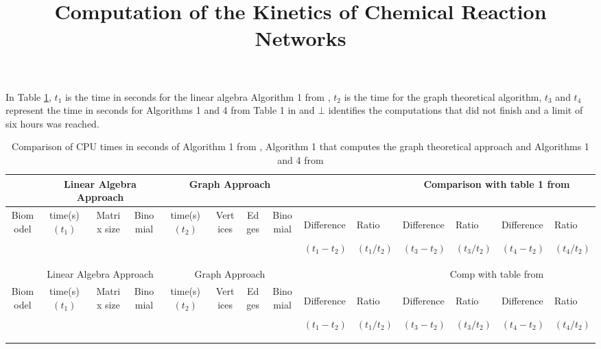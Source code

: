 \documentclass[11pt]{article}
\begin{document}
\begin{landscape}
\title{Computation of the Kinetics of Chemical Reaction Networks}
\date{}
\author{}
\maketitle

In Table \ref{t:res}, $t_{1}$ is the time in seconds for the linear algebra Algorithm 1 from \cite{rahkooy2020linear}, $t_{2}$ is the time for the graph theoretical algorithm, $t_{3}$ and $t_{4}$ represent the time in seconds for Algorithms 1 and 4 from Table 1 in \cite{grigoriev2019efficiently} and $\bot$ identifies the computations that did not finish and a limit of six hours was reached.
\setlength{\tabcolsep}{2pt}
\begin{small}
\begin{longtable}[c]{| c | c | c | c |c |c |c |c |p{1.5cm} |p{1.5cm} |p{1.5cm} |p{1.5cm} |p{1.5cm} |p{1.5cm} |}

 \caption{Comparison of CPU times in seconds of Algorithm 1 from \cite{rahkooy2020linear}, Algorithm 1 that computes the graph theoretical approach and Algorithms 1 and 4 from \cite{grigoriev2019efficiently}\label{t:res}}\\

 \hline
  & \multicolumn{3}{|c|}{Linear Algebra Approach} & \multicolumn{4}{|c|}{Graph Approach} &\multicolumn{2}{|c|}{}&\multicolumn{4}{|c|}{Comparison with table 1 from \cite{grigoriev2019efficiently}}\\
 \hline
 Biomodel & time(s)$(t_{1})$ & Matrix size & Binomial &  time(s)$(t_{2})$ & Vertices & Edges &Binomial & Difference \par$(t_{1}-t_{2})$ & Ratio\par$(t_{1}/t_{2})$ & Difference \par$(t_{3}-t_{2})$&Ratio\par$(t_{3}/t_{2})$ &Difference\par$(t_{4}-t_{2})$ &Ratio\par$(t_{4}/t_{2})$\\
 \hline
 \endfirsthead

 \hline
 &\multicolumn{3}{|c|}{Linear Algebra Approach}& \multicolumn{4}{|c|}{Graph Approach}&\multicolumn{2}{|c|}{}&\multicolumn{4}{|c|}{Comp with table from }\\
 \hline
 Biomodel & time(s)$(t_{1})$ & Matrix size & Binomial& time(s)$(t_{2})$ & Vertices & Edges &Binomial& Difference\par$(t_{1}-t_{2})$ & Ratio\par$(t_{1}/t_{2})$& Difference\par$(t_{3}-t_{2})$&Ratio\par$(t_{3}/t_{2})$ &Difference\par$(t_{4}-t_{2})$ &Ratio\par$(t_{4}/t_{2})$\\
 \hline
 \endhead


\end{longtable}
\end{small}
\end{landscape}
\end{document}
